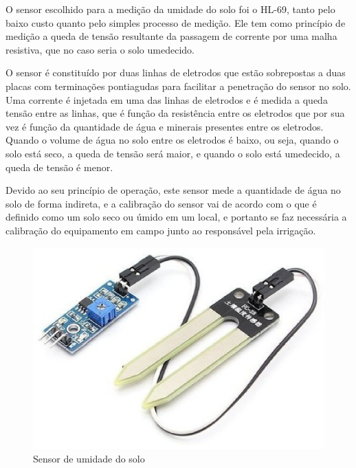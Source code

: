   O sensor escolhido para a medição da umidade do solo foi o HL-69,
  tanto pelo baixo custo quanto pelo simples processo de medição.
  Ele tem como princípio de medição a queda de tensão resultante da
  passagem de corrente por uma malha resistiva, que no caso seria o solo
  umedecido.

  O sensor é constituído por duas linhas de eletrodos que estão
  sobrepostas a duas placas com terminações pontiagudas para facilitar a
  penetração do sensor no solo. Uma corrente é injetada em uma das linhas
  de eletrodos e é medida a queda tensão entre as linhas, que é função da
  resistência entre os eletrodos que por sua vez é função da quantidade de
  água e minerais presentes entre os eletrodos. Quando o volume de água no
   solo entre os eletrodos é baixo, ou seja, quando o solo está seco,
   a queda de tensão será maior, e quando o solo está umedecido,
   a queda de tensão é menor.

  Devido ao seu princípio de operação, este sensor mede a quantidade de
  água no solo de forma indireta, e a calibração do sensor vai de acordo
  com o que é definido como um solo seco ou úmido em um local, e portanto
  se faz necessária a calibração do equipamento em campo junto ao
  responsável pela irrigação.

  \begin{figure}[!htbp]
  \begin{center}
  \includegraphics[keepaspectratio=true,scale=0.3]{figuras/higrometer.eps}
  \caption{\label{DHT11}Sensor de umidade do solo}
  \end{center}
  \end{figure}


